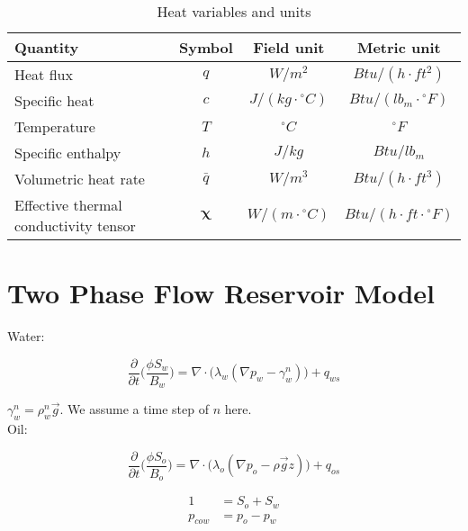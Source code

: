 \documentclass[12pt]{article}
\begin{document}
\newpage
\begin{center}
\begin{table}
\caption[Heat variables and units]{Heat variables and units}\label{heat_vtable}
\begin{center}
\begin{tabular}{lccc}
\toprule
\textbf{Quantity} & Symbol & Field unit & Metric unit 		\\
\toprule
Heat flux & $q$ & $W/m^{2}$ & $Btu/ (h \cdot ft^2)$	\\
Specific heat & $c$ & $J/(kg\cdot {}^\circ C)$ & $Btu/(lb_m\cdot {}^\circ F)$	\\
Temperature & $T$ & ${}^\circ C$& ${}^\circ F$	\\
Specific enthalpy & $h$ & $J/kg$ & $Btu/lb_m$			\\
Volumetric heat rate & $\bar{q}$ & $W/m^{3}$ & $Btu/ (h \cdot ft^3)$	\\
Effective thermal conductivity tensor & $\mathbf{\chi}$ & $W/ (m \cdot {}^\circ C)$ & $Btu/ (h \cdot ft\cdot {}^\circ F)$ 	\\
\bottomrule
\end{tabular}
\end{center}
\end{table}
\end{center}

\section{Two Phase Flow Reservoir Model}
Water:

\begin{equation}
\frac{\partial}{\partial t}\Big(\frac{\phi S_w}{B_w}\Big) = \nabla\cdot\Big(\lambda_w(\nabla p_w-\gamma_w^n)\Big)+q_{ws}
\end{equation}

$\gamma^n_w = \rho_w^n\vec{g}$. We assume a time step of $n$ here.
\\
Oil:

\begin{equation}
\frac{\partial}{\partial t}\Big(\frac{\phi S_o}{B_o}\Big) = \nabla\cdot\Big(\lambda_o(\nabla p_o-\rho\vec{g}z)\Big)+q_{os}
\end{equation}

\begin{equation}
\begin{split}
1&=S_o+S_w \\
p_{cow} &= p_o-p_w		
\end{split}
\end{equation}
\end{document}
